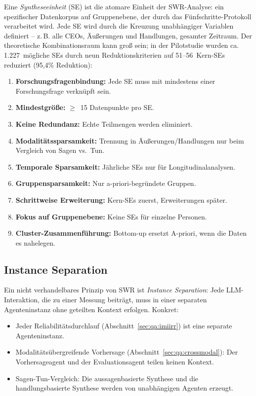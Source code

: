 \documentclass[11pt,a4paper]{article}
\begin{document}
Eine \emph{Syntheseeinheit} (SE) ist die atomare Einheit der SWR-Analyse: ein spezifischer Datenkorpus auf Gruppenebene, der durch das Fünfschritte-Protokoll verarbeitet wird. Jede SE wird durch die Kreuzung unabhängiger Variablen definiert -- z.\,B. \glqq{}alle CEOs, Äußerungen und Handlungen, gesamter Zeitraum\grqq{}. Der theoretische Kombinationsraum kann groß sein; in der Pilotstudie wurden ca. 1.227~mögliche SEs durch neun Reduktionskriterien auf 51--56~Kern-SEs reduziert (95,4\% Reduktion):

\begin{enumerate}[nosep]
  \item \textbf{Forschungsfragenbindung:} Jede SE muss mit mindestens einer Forschungsfrage verknüpft sein.
  \item \textbf{Mindestgröße:} $\geq$~15 Datenpunkte pro SE.
  \item \textbf{Keine Redundanz:} Echte Teilmengen werden eliminiert.
  \item \textbf{Modalitätssparsamkeit:} Trennung in Äußerungen/Handlungen nur beim Vergleich von Sagen vs.\ Tun.
  \item \textbf{Temporale Sparsamkeit:} Jährliche SEs nur für Longitudinalanalysen.
  \item \textbf{Gruppensparsamkeit:} Nur a-priori-begründete Gruppen.
  \item \textbf{Schrittweise Erweiterung:} Kern-SEs zuerst, Erweiterungen später.
  \item \textbf{Fokus auf Gruppenebene:} Keine SEs für einzelne Personen.
  \item \textbf{Cluster-Zusammenführung:} Bottom-up ersetzt A-priori, wenn die Daten es nahelegen.
\end{enumerate}


\subsection{Instance Separation}
\label{sec:method:instance}

Ein nicht verhandelbares Prinzip von SWR ist \emph{Instance Separation}: Jede LLM-Interaktion, die zu einer Messung beiträgt, muss in einer separaten Agenteninstanz ohne geteilten Kontext erfolgen. Konkret:

\begin{itemize}[nosep]
  \item Jeder Reliabilitätsdurchlauf (Abschnitt~\ref{sec:qa:imiirr}) ist eine separate Agenteninstanz.
  \item Modalitätsübergreifende Vorhersage (Abschnitt~\ref{sec:qa:crossmodal}): Der Vorhersageagent und der Evaluationsagent teilen keinen Kontext.
  \item Sagen-Tun-Vergleich: Die aussagenbasierte Synthese und die handlungsbasierte Synthese werden von unabhängigen Agenten erzeugt.
\end{itemize}
\end{document}
